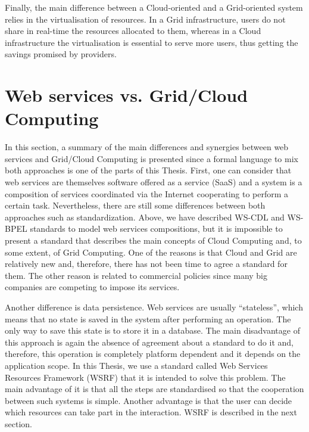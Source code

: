 Finally, the main difference between a Cloud-oriented and a Grid-oriented system relies in the virtualisation of resources. 
In a Grid infrastructure, users do not share in real-time the resources allocated to them, 
whereas in a Cloud infrastructure the virtualisation is essential to serve more users,
thus getting the savings promised by providers.

\section*{Web services vs. Grid/Cloud Computing}

In this section, a summary of the main differences and synergies between web services and
Grid/Cloud Computing is presented since a formal language to mix both approaches is one of the parts of this
Thesis. First, one can consider that web services are themselves software offered as a service (SaaS)
and a system is a composition of services coordinated via the Internet
cooperating to perform a certain task. Nevertheless, 
there are still some differences between both approaches such as standardization. Above,
we have described WS-CDL and WS-BPEL standards to model web services compositions, but
it is impossible to present a standard that describes the main concepts of Cloud Computing and, to some
extent, of Grid Computing. One of the reasons is that Cloud and Grid are relatively new and, therefore,
there has not been time to agree a standard for them. The other reason is related to commercial policies since
many big companies are competing to impose its services.  

Another difference is data persistence. Web services are usually ``stateless'', which means that
no state is saved in the system after performing an operation. The only way to save
this state is to store it in a database. The main disadvantage of this approach is again the absence of 
agreement about a standard to do it and, therefore, this operation is completely platform dependent 
and it depends on the application scope. 
In this Thesis, we use a standard called Web Services Resources Framework (WSRF) that it is intended to solve this problem. 
The main advantage of it is that all the steps are standardised so that the cooperation 
between such systems is simple. Another advantage is that the user can decide which 
resources can take part in the interaction. WSRF is described in the next section. 

